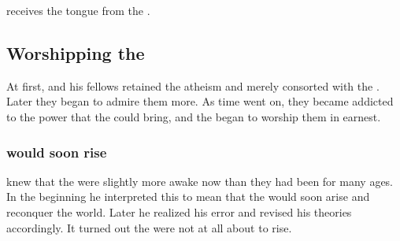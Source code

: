 \Xserasshana{} receives the  tongue from the \xss. 










\subsection{Worshipping the \xzaishanns}
At first, \Sethicus and his fellows retained the \ophidians atheism and merely consorted with the \xss. 
Later they began to admire them more. 
As time went on, they became addicted to the power that the \xss could bring, and the began to worship them in earnest. 






\subsubsection{\XzaiShanns would soon rise}
\Sethicus knew that the \xss were slightly more awake now than they had been for many ages.
In the beginning he interpreted this to mean that the \xss would soon arise and reconquer the world. 
Later he realized his error and revised his theories accordingly. 
It turned out the \xss were not at all about to rise. 









